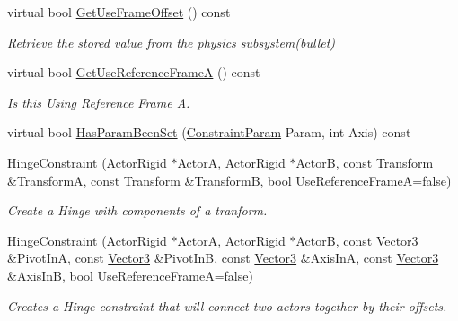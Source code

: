 \begin{DoxyCompactItemize}
\item 
virtual bool \hyperlink{classphys_1_1HingeConstraint_a411bf09ec4aade190de13eb5a7f46b8a}{GetUseFrameOffset} () const 
\begin{DoxyCompactList}\small\item\em Retrieve the stored value from the physics subsystem(bullet) \item\end{DoxyCompactList}\item 
virtual bool \hyperlink{classphys_1_1HingeConstraint_ab90932d63a43ba7a55afadbe396a0951}{GetUseReferenceFrameA} () const 
\begin{DoxyCompactList}\small\item\em Is this Using Reference Frame A. \item\end{DoxyCompactList}\item 
virtual bool \hyperlink{classphys_1_1HingeConstraint_ad8d648a1c484966a828e7af71286e8b4}{HasParamBeenSet} (\hyperlink{namespacephys_aa1e7cf2d7efcaeaeac304f711e7564e8}{ConstraintParam} Param, int Axis) const 
\item 
\hyperlink{classphys_1_1HingeConstraint_a725b932ea223d2218f0b7a03b61e1650}{HingeConstraint} (\hyperlink{classphys_1_1ActorRigid}{ActorRigid} $\ast$ActorA, \hyperlink{classphys_1_1ActorRigid}{ActorRigid} $\ast$ActorB, const \hyperlink{classphys_1_1Transform}{Transform} \&TransformA, const \hyperlink{classphys_1_1Transform}{Transform} \&TransformB, bool UseReferenceFrameA=false)
\begin{DoxyCompactList}\small\item\em Create a Hinge with components of a tranform. \item\end{DoxyCompactList}\item 
\hyperlink{classphys_1_1HingeConstraint_aa4e74519af2c4773de038fb1ae2776eb}{HingeConstraint} (\hyperlink{classphys_1_1ActorRigid}{ActorRigid} $\ast$ActorA, \hyperlink{classphys_1_1ActorRigid}{ActorRigid} $\ast$ActorB, const \hyperlink{classphys_1_1Vector3}{Vector3} \&PivotInA, const \hyperlink{classphys_1_1Vector3}{Vector3} \&PivotInB, const \hyperlink{classphys_1_1Vector3}{Vector3} \&AxisInA, const \hyperlink{classphys_1_1Vector3}{Vector3} \&AxisInB, bool UseReferenceFrameA=false)
\begin{DoxyCompactList}\small\item\em Creates a Hinge constraint that will connect two actors together by their offsets. \item\end{DoxyCompactList}\item 

\end{DoxyCompactItemize}
